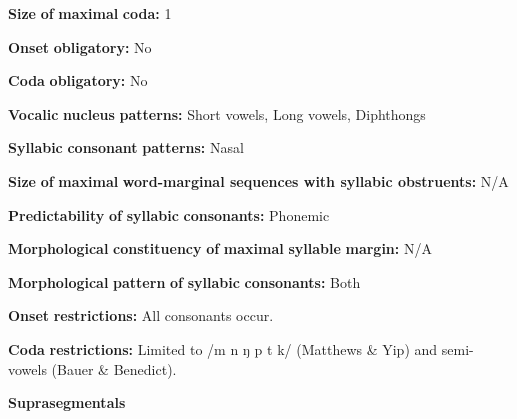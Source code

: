 \documentclass[output=paper]{langsci/langscibook}
\begin{document}
\begin{styleBody}
\textbf{Size} \textbf{of} \textbf{maximal} \textbf{coda:} 1
\end{styleBody}

\begin{styleBody}
\textbf{Onset} \textbf{obligatory:} No
\end{styleBody}

\begin{styleBody}
\textbf{Coda} \textbf{obligatory:} No
\end{styleBody}

\begin{styleBody}
\textbf{Vocalic} \textbf{nucleus} \textbf{patterns:} Short vowels, Long vowels, Diphthongs
\end{styleBody}

\begin{styleBody}
\textbf{Syllabic} \textbf{consonant} \textbf{patterns:} Nasal
\end{styleBody}

\begin{styleBody}
\textbf{Size} \textbf{of} \textbf{maximal} \textbf{word{}-marginal sequences with syllabic obstruents:} N/A
\end{styleBody}

\begin{styleBody}
\textbf{Predictability} \textbf{of} \textbf{syllabic} \textbf{consonants:} Phonemic
\end{styleBody}

\begin{styleBody}
\textbf{Morphological} \textbf{constituency} \textbf{of} \textbf{maximal} \textbf{syllable} \textbf{margin:} N/A
\end{styleBody}

\begin{styleBody}
\textbf{Morphological} \textbf{pattern} \textbf{of} \textbf{syllabic} \textbf{consonants:} Both
\end{styleBody}

\begin{styleBody}
\textbf{Onset} \textbf{restrictions:} All consonants occur.
\end{styleBody}

\begin{styleBody}
\textbf{Coda} \textbf{restrictions:} Limited to /m n ŋ p t k/ (Matthews \& Yip) and semi-vowels (Bauer \& Benedict).
\end{styleBody}

\begin{styleBody}
\textbf{Suprasegmentals}
\end{styleBody}
\end{document}
